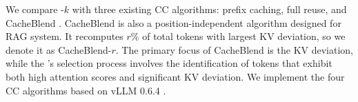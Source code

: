 

We compare \sys-$k$ with three existing CC algorithms: prefix caching, full reuse, and CacheBlend \cite{yao2024cacheblend}. CacheBlend is also a position-independent algorithm designed for RAG system. It recomputes $r$\% of total tokens with largest KV deviation, so we denote it as CacheBlend-$r$. The primary focus of CacheBlend is the KV deviation, while the \sys's selection process involves the identification of tokens that exhibit both high attention scores and significant KV deviation. We implement the four CC algorithms based on vLLM 0.6.4 \cite{kwon2023efficient}.


